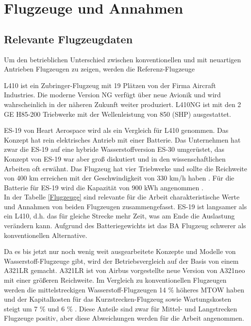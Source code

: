 
\section{Flugzeuge und Annahmen}
\subsection{Relevante Flugzeugdaten}
Um den betrieblichen Unterschied zwischen konventionellen und mit neuartigen Antrieben Flugzeugen zu zeigen, werden die Referenz-Flugzeuge

L410 ist ein Zubringer-Flugzeug mit 19 Plätzen von der Firma Aircraft Industries. Die moderne Version NG verfügt über neue Avionik und wird
wahrscheinlich in der näheren Zukunft weiter produziert.
L410NG ist mit den 2 GE H85-200 Triebwerke mit der Wellenleistung von 850 (SHP) ausgestattet.


ES-19 von Heart Aerospace wird als ein Vergleich für L410 genommen. Das Konzept hat rein elektrisches Antrieb mit einer Batterie.
Das Unternehmen hat zwar die ES-19 auf eine hybride Wasserstoffversion ES-30 umgerüstet, das Konzept von ES-19 war aber groß diskutiert 
und in den wissenschaftlichen Arbeiten oft erwähnt. Das Flugzeug hat vier Triebwerke und sollte die Reichweite von 400 km erreichen 
mit der Geschwindigkeit von 330 km/h haben \cite{anker2023feasibility} \cite{heart_aerospace_es19}.
Für die Batterie für ES-19 wird die Kapazität von 900 kWh angenommen \cite{donckers2024electric}. \\
In der Tabelle \ref{Flugzeuge} sind relevante für die Arbeit charakteristische Werte und Annahmen von beiden Flugzeugen zusammengefasst.
ES-19 ist langsamer als ein L410, d.h. das für gleiche Strecke mehr Zeit, was am Ende die Auslastung verändern kann.
Aufgrund des Batteriegewichts ist das BA Flugzeug schwerer als konventionellen Alternative.

Da es bis jetzt nur noch wenig weit ausgearbeitete Konzepte und Modelle von Wasserstoff-Flugzeuge gibt, wird der Betriebsvergleich
auf der Basis von einem A321LR gemacht.
A321LR ist von Airbus vorgestellte neue Version von A321neo mit einer größeren Reichweite.
Im Vergleich zu konventionellen Flugzeugen werden die mittelstreckigen Wasserstoff-Flugzeugen 14 \% höheres MTOW haben 
und der Kapitalkosten für das Kurzstrecken-Flugzeug sowie Wartungskosten steigt um 7 \% und 6 \% \cite{sky2020hydrogen}. 
Diese Anteile sind zwar für Mittel- und Langstrecken Flugzeuge positiv, aber diese Abweichungen werden für die Arbeit angenommen.

